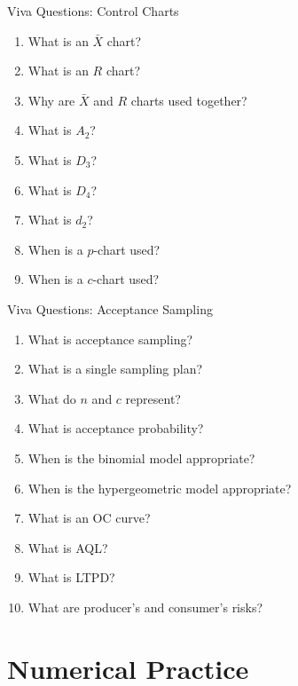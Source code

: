 \documentclass[aspectratio=169,10pt]{beamer}
\begin{document}
\begin{frame}[shrink=18]{Viva Questions: Control Charts}
\small

\begin{enumerate}
    \item What is an $\bar X$ chart?
    \item What is an \(R\) chart?
    \item Why are $\bar X$ and \(R\) charts used together?
    \item What is \(A_2\)?
    \item What is \(D_3\)?
    \item What is \(D_4\)?
    \item What is \(d_2\)?
    \item When is a \(p\)-chart used?
    \item When is a \(c\)-chart used?
\end{enumerate}

\end{frame}


\begin{frame}[shrink=18]{Viva Questions: Acceptance Sampling}
\small

\begin{enumerate}
    \item What is acceptance sampling?
    \item What is a single sampling plan?
    \item What do \(n\) and \(c\) represent?
    \item What is acceptance probability?
    \item When is the binomial model appropriate?
    \item When is the hypergeometric model appropriate?
    \item What is an OC curve?
    \item What is AQL?
    \item What is LTPD?
    \item What are producer's and consumer's risks?
\end{enumerate}

\end{frame}


\section{Numerical Practice}
\end{document}
